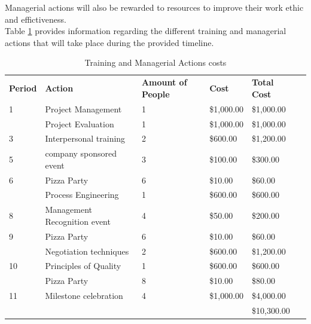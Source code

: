 \noindent
Managerial actions will also be rewarded to resources to improve their work ethic and effictiveness.\\

\noindent
Table \ref{tab:actions} provides information regarding the different training and managerial actions that will take place during the provided timeline.

\begin{table}[]
\centering
\caption{Training and Managerial Actions costs}
\label{tab:actions}
\begin{tabular}{llllll}
\textbf{Period} & \textbf{Action}              & \textbf{Amount of People} & \textbf{Cost} & \textbf{Total Cost}                 &  \\
1               & Project Management           & 1                         & \$1,000.00    & \$1,000.00                          &  \\
                & Project Evaluation           & 1                         & \$1,000.00    & \$1,000.00                          &  \\
3               & Interpersonal training       & 2                         & \$600.00      & \$1,200.00                          &  \\
5               & company sponsored event      & 3                         & \$100.00      & \$300.00                            &  \\
6               & Pizza Party                  & 6                         & \$10.00       & \$60.00                             &  \\
                & Process Engineering          & 1                         & \$600.00      & \$600.00                            &  \\
8               & Management Recognition event & 4                         & \$50.00       & \$200.00                            &  \\
9               & Pizza Party                  & 6                         & \$10.00       & \$60.00                             &  \\
                & Negotiation techniques       & 2                         & \$600.00      & \$1,200.00                          &  \\
10              & Principles of Quality        & 1                         & \$600.00      & \$600.00                            &  \\
                & Pizza Party                  & 8                         & \$10.00       & \$80.00                             &  \\
11              & Milestone celebration        & 4                         & \$1,000.00    & \$4,000.00                          &  \\
                &                              &                           &               & \cellcolor[HTML]{FFFE65}\$10,300.00 & 
\end{tabular}
\end{table}

